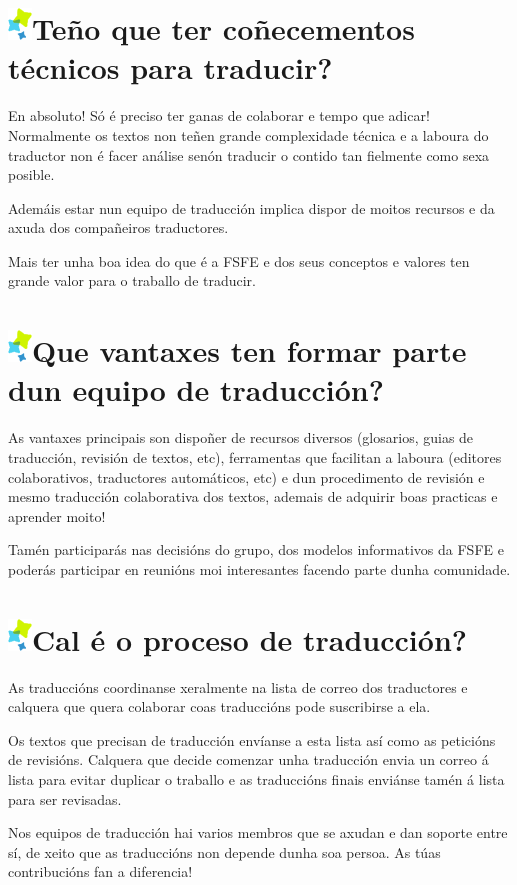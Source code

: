 \documentclass[10pt,foldmark,tumble]{leaflet}
\newcommand{\tit}[1]{\section{\protect\includegraphics{item.png}#1}}
\begin{document}
\tit{Teño que ter coñecementos técnicos para traducir?}

En absoluto! Só é preciso ter ganas de colaborar e tempo que adicar! Normalmente os textos non teñen grande complexidade técnica e a laboura do traductor non é facer análise senón traducir o contido tan fielmente como sexa posible. 

Ademáis estar nun equipo de traducción implica dispor de moitos recursos e da axuda dos compañeiros traductores.

Mais ter unha boa idea do que é a FSFE e dos seus conceptos e valores ten grande valor para o traballo de traducir.

\tit{Que vantaxes ten formar parte dun equipo de traducción?}

As vantaxes principais son dispoñer de recursos diversos (glosarios, guias de traducción, revisión de textos, etc), ferramentas que facilitan a laboura (editores colaborativos, traductores automáticos, etc) e dun procedimento de revisión e mesmo traducción colaborativa dos textos, ademais de adquirir boas practicas e aprender moito!

Tamén participarás nas decisións do grupo, dos modelos informativos da FSFE e poderás participar en reunións moi interesantes facendo parte dunha comunidade.

\tit{Cal é o proceso de traducción?}

As traduccións coordinanse xeralmente na lista de correo dos traductores e calquera que quera colaborar coas traduccións pode suscribirse a ela. 

Os textos que precisan de traducción envíanse a esta lista así como as peticións de revisións. Calquera que decide comenzar unha traducción envia un correo á lista para evitar duplicar o traballo e as traduccións finais enviánse tamén á lista para ser revisadas.

Nos equipos de traducción hai varios membros que se axudan e dan soporte entre sí, de xeito que as traduccións non depende dunha soa persoa. As túas contribucións fan a diferencia!



\vspace{10em}
\end{document}
